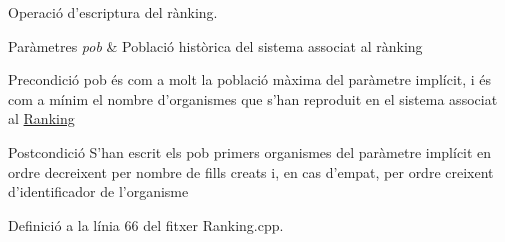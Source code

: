 Operació d'escriptura del rànking. 


\begin{DoxyParams}{Paràmetres}
{\em pob} & Població històrica del sistema associat al rànking \\
\hline
\end{DoxyParams}
\begin{DoxyPrecond}{Precondició}
{\ttfamily pob} és com a molt la població màxima del paràmetre implícit, i és com a mínim el nombre d'organismes que s'han reproduit en el sistema associat al \hyperlink{class_ranking}{Ranking} 
\end{DoxyPrecond}
\begin{DoxyPostcond}{Postcondició}
S'han escrit els {\ttfamily pob} primers organismes del paràmetre implícit en ordre decreixent per nombre de fills creats i, en cas d'empat, per ordre creixent d'identificador de l'organisme 
\end{DoxyPostcond}


Definició a la línia 66 del fitxer Ranking.\-cpp.



